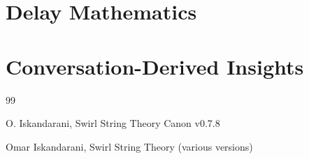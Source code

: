 \documentclass[11pt]{article}
\theoremstyle{definition}
\theoremstyle{plain}
\theoremstyle{remark}
\begin{document}
    \section{Delay Mathematics}
        \label{sec:appendix_delay}
        
        
    
    \section{Conversation-Derived Insights}
        \label{sec:appendix_conversations}
        
        

        \begin{thebibliography}{99}
            
            O. Iskandarani, Swirl String Theory Canon v0.7.8
            
            Omar Iskandarani, Swirl String Theory (various versions)
        
        \end{thebibliography}
\end{document}
